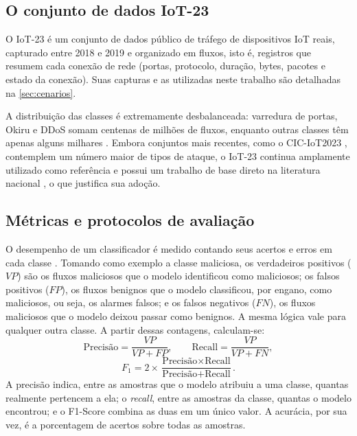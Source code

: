 \documentclass[alpha-refs,brazilian]{CC-EC_TF-TC}
\begin{document}
\subsection{O conjunto de dados IoT-23}

O IoT-23 \citep{garcia2020iot23} é um conjunto de dados público de tráfego de dispositivos IoT reais, capturado entre 2018 e 2019 e organizado em fluxos, isto é, registros que resumem cada conexão de rede (portas, protocolo, duração, bytes, pacotes e estado da conexão). Suas capturas e as utilizadas neste trabalho são detalhadas na \autoref{sec:cenarios}.

A distribuição das classes é extremamente desbalanceada: varredura de portas, Okiru e DDoS somam centenas de milhões de fluxos, enquanto outras classes têm apenas alguns milhares \citep{garcia2020iot23}. Embora conjuntos mais recentes, como o CIC-IoT2023 \citep{neto2023ciciot2023}, contemplem um número maior de tipos de ataque, o IoT-23 continua amplamente utilizado como referência e possui um trabalho de base direto na literatura nacional \citep{souza2024avaliacao}, o que justifica sua adoção.

\subsection{Métricas e protocolos de avaliação}
\label{sec:rev-metricas}

O desempenho de um classificador é medido contando seus acertos e erros em cada classe \citep{sokolova2009systematic}. Tomando como exemplo a classe maliciosa, os verdadeiros positivos ($VP$) são os fluxos maliciosos que o modelo identificou como maliciosos; os falsos positivos ($FP$), os fluxos benignos que o modelo classificou, por engano, como maliciosos, ou seja, os alarmes falsos; e os falsos negativos ($FN$), os fluxos maliciosos que o modelo deixou passar como benignos. A mesma lógica vale para qualquer outra classe. A partir dessas contagens, calculam-se:
\begin{equation}
\text{Precisão} = \frac{VP}{VP+FP}, \qquad \text{Recall} = \frac{VP}{VP+FN},
\end{equation}
\begin{equation}
F_1 = 2 \times \frac{\text{Precisão} \times \text{Recall}}{\text{Precisão} + \text{Recall}}.
\end{equation}
A precisão indica, entre as amostras que o modelo atribuiu a uma classe, quantas realmente pertencem a ela; o \textit{recall}, entre as amostras da classe, quantas o modelo encontrou; e o F1-Score combina as duas em um único valor. A acurácia, por sua vez, é a porcentagem de acertos sobre todas as amostras.
\end{document}
